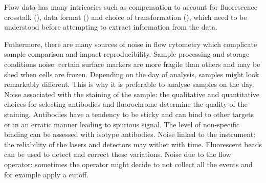 
Flow data has many intricacies
such as compensation to account for fluorescence crosstalk (),
data format ()
and choice of transformation (),
which need to be understood before attempting to extract information from the data.

Futhermore, there are many sources of noise in flow cytometry which complicate sample comparison and impact reproducibility.  
Sample processing and storage conditions noise:
certain surface markers are more fragile than others and may be shed when cells are frozen.
Depending on the day of analysis, samples might look remarkably different.
This is why it is preferable to analyse samples on the day.  
Noise associated with the staining of the sample:
the qualitative and quantitative choices for selecting antibodies and fluorochrome determine the quality of the staining.
Antibodies have a tendency to be sticky and can bind to other targets or in an erratic manner leading to spurious signal.
The level of non-specific binding can be assessed with isotype antibodies.  
Noise linked to the instrument:
the reliability of the lasers and detectors may wither with time.
Fluorescent beads can be used to detect and correct these variations.  
Noise due to the flow operator:
sometimes the operator might decide to not collect all the events and for example apply a cutoff.

